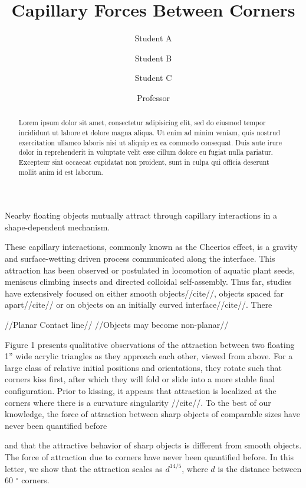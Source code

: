 \documentclass[twocolumn,prl]{revtex4-1}
\begin{document}
\title{Capillary Forces Between Corners}
\author{Student A}
\author{Student B}
\author{Student C}
\author{Professor}

\begin{abstract}
	Lorem ipsum dolor sit amet, consectetur adipisicing elit, sed do eiusmod tempor incididunt ut labore et dolore magna aliqua. Ut enim ad minim veniam, quis nostrud exercitation ullamco laboris nisi ut aliquip ex ea commodo consequat. Duis aute irure dolor in reprehenderit in voluptate velit esse cillum dolore eu fugiat nulla pariatur. Excepteur sint occaecat cupidatat non proident, sunt in culpa qui officia deserunt mollit anim id est laborum.
\end{abstract}

\maketitle

	Nearby floating objects mutually attract through capillary interactions in a shape-dependent mechanism. 
	
	These capillary interactions, commonly known as the Cheerios effect, is a gravity and surface-wetting driven process communicated along the interface. This attraction has been observed or postulated in locomotion of aquatic plant seeds\cite{peruzzo2013capillary}, meniscus climbing insects\cite{hu2005meniscus} and directed colloidal self-assembly\cite{fan2004assembly}. Thus far, studies have extensively focused on either smooth objects//cite//, objects spaced far apart//cite// or on objects on an initially curved interface//cite//. There  
	
	
	//Planar Contact line//
	//Objects may become non-planar//
	
	
	Figure 1 presents qualitative observations of the attraction between two floating 1'' wide acrylic triangles as they approach each other, viewed from above. For a large class of relative initial positions and orientations, they rotate such that corners kiss first, after which they will fold or slide into a more stable final configuration. Prior to kissing, it appears that attraction is localized at the corners where there is a curvature singularity //cite//. To the best of our knowledge, the force of attraction between sharp objects of comparable sizes have never been quantified before
	
	and that the attractive behavior of sharp objects is different from smooth objects. The force of attraction due to corners have never been quantified before. In this letter, we show that the attraction scales as $d^{14/5}$, where $d$ is the distance between 60 $^{\circ} $ corners. 
	
\end{document}
